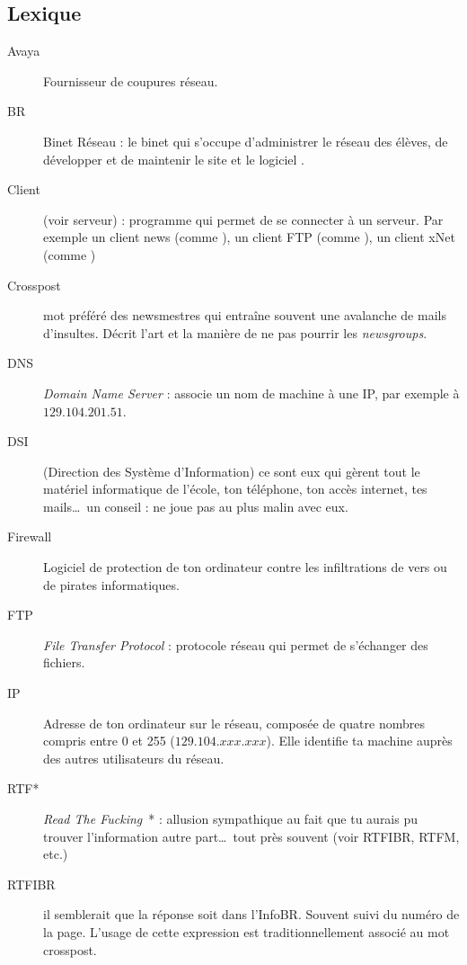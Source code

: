 
\subsection{Lexique}

\begin{description}
  \item[Avaya] Fournisseur de coupures réseau.
  \item[BR] Binet Réseau : le binet qui s'occupe d'administrer le réseau des élèves, de développer et de maintenir le site  et le logiciel .
  \item[Client] (voir serveur) : programme qui permet de se connecter à un serveur. Par exemple un client news (comme ), un client FTP (comme ), un client xNet (comme )
  \item[Crosspost] mot préféré des newsmestres qui entraîne souvent une avalanche de mails d'insultes. Décrit l'art et la manière de ne pas pourrir les \emph{newsgroups}.
  \item[DNS] \emph{Domain Name Server} : associe un nom de machine à une IP, par exemple  à \linebreak{} $129.104.201.51$.
  \item[DSI] (Direction des Système d'Information) ce sont eux qui gèrent tout le matériel informatique de l'école, ton téléphone, ton accès internet, tes mails\ldots\ un conseil : ne joue pas au plus malin avec eux.
  \item[Firewall] Logiciel de protection de ton ordinateur contre les infiltrations de vers ou de pirates informatiques.
  \item[FTP] \emph{File Transfer Protocol} : protocole réseau qui permet de s'échanger des fichiers.
  \item[IP] Adresse de ton ordinateur sur le réseau, composée de quatre nombres compris entre 0 et 255 \linebreak ($129.104.xxx.xxx$). Elle identifie ta machine auprès des autres utilisateurs du réseau.
  \item[RTF*] \emph{Read The Fucking}\ * : allusion sympathique au fait que tu aurais pu trouver l'information autre part\ldots\ tout près souvent (voir RTFIBR, RTFM, etc.)
  \item[RTFIBR] il semblerait que la réponse soit dans l'InfoBR. Souvent suivi du numéro de la page. L'usage de cette expression est traditionnellement associé au mot crosspost.

\end{description}
